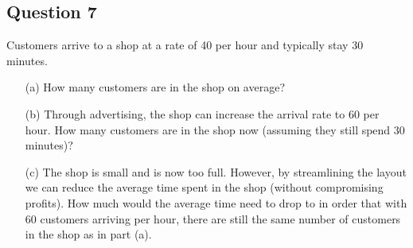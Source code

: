 \documentclass[]{report}
\begin{document}
\subsection*{Question 7}
Customers arrive to a shop at a rate of 40 per hour and typically stay 30 minutes. \\[-0.2cm]
\begin{itemize}
\item[(a)] How many customers are in the shop on average?  \item[(b)] Through advertising, the shop can increase the arrival rate to 60 per hour. How many customers are in the shop now (assuming they still spend 30 minutes)?  \item[(c)] The shop is small and is now too full. However, by streamlining the layout we can reduce the average time spent in the shop (without compromising profits). How much would the average time need to drop to in order that with 60 customers arriving per hour, there are still the same number of customers in the shop as in part (a).


\end{itemize}
\end{document}
